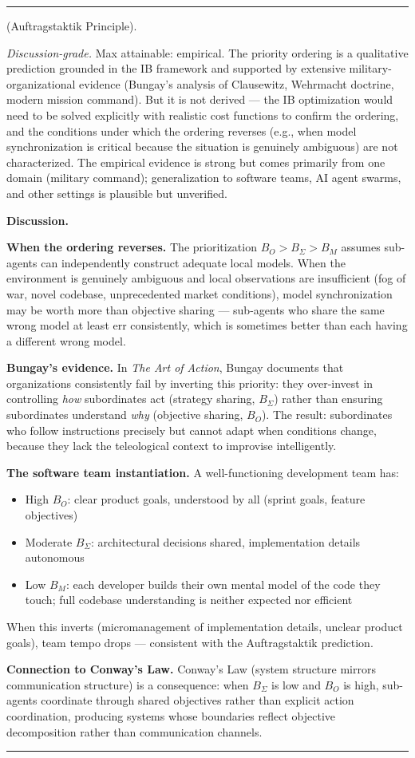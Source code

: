 \documentclass[11pt,oneside]{article}
\newcounter{claim}[section]
\renewcommand{\theclaim}{\thesection.\arabic{claim}}
\newenvironment{segment}[2]{%
  \refstepcounter{claim}%
  \bigskip\noindent\hrule\smallskip
  \noindent{\bfseries #1~\theclaim}\enskip(#2).\par\smallskip
  \noindent\ignorespaces
}{%
  \par\smallskip\noindent\hrule\bigskip
}
\newenvironment{hypothesis}[1][]{\begin{segment}{Hypothesis}{#1}}{\end{segment}}
\begin{document}
\begin{hypothesis}[Auftragstaktik Principle]
\textit{Discussion-grade.} Max attainable: empirical. The priority ordering is a qualitative prediction grounded in the IB framework and supported by extensive military-organizational evidence (Bungay's analysis of Clausewitz, Wehrmacht doctrine, modern mission command). But it is not derived — the IB optimization would need to be solved explicitly with realistic cost functions to confirm the ordering, and the conditions under which the ordering reverses (e.g., when model synchronization is critical because the situation is genuinely ambiguous) are not characterized. The empirical evidence is strong but comes primarily from one domain (military command); generalization to software teams, AI agent swarms, and other settings is plausible but unverified.


\medskip\noindent\textbf{Discussion.}


\textbf{When the ordering reverses.} The prioritization $B_O > B_\Sigma > B_M$ assumes sub-agents can independently construct adequate local models. When the environment is genuinely ambiguous and local observations are insufficient (fog of war, novel codebase, unprecedented market conditions), model synchronization may be worth more than objective sharing — sub-agents who share the same wrong model at least err consistently, which is sometimes better than each having a different wrong model.

\textbf{Bungay's evidence.} In \textit{The Art of Action}, Bungay documents that organizations consistently fail by inverting this priority: they over-invest in controlling \textit{how} subordinates act (strategy sharing, $B_\Sigma$) rather than ensuring subordinates understand \textit{why} (objective sharing, $B_O$). The result: subordinates who follow instructions precisely but cannot adapt when conditions change, because they lack the teleological context to improvise intelligently.

\textbf{The software team instantiation.} A well-functioning development team has:
\begin{itemize}
  \item High $B_O$: clear product goals, understood by all (sprint goals, feature objectives)
  \item Moderate $B_\Sigma$: architectural decisions shared, implementation details autonomous
  \item Low $B_M$: each developer builds their own mental model of the code they touch; full codebase understanding is neither expected nor efficient
\end{itemize}


When this inverts (micromanagement of implementation details, unclear product goals), team tempo drops — consistent with the Auftragstaktik prediction.

\textbf{Connection to Conway's Law.} Conway's Law (system structure mirrors communication structure) is a consequence: when $B_\Sigma$ is low and $B_O$ is high, sub-agents coordinate through shared objectives rather than explicit action coordination, producing systems whose boundaries reflect objective decomposition rather than communication channels.

\end{hypothesis}
\end{document}
